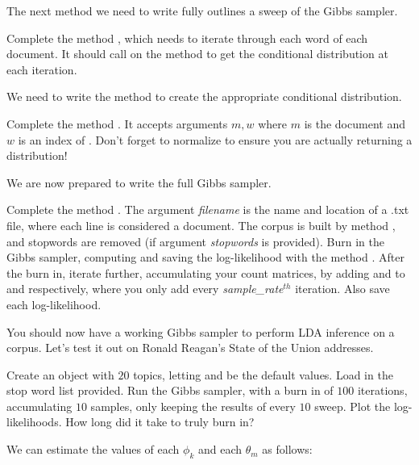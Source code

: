 The next method we need to write fully outlines a sweep of the Gibbs sampler.

\begin{problem}
Complete the method , which needs to iterate through each word of each document. It should call on the method  to get the conditional distribution at each iteration.
\end{problem}

We need to write the method to create the appropriate conditional distribution.

\begin{problem}
Complete the method . It accepts arguments $m,w$ where $m$ is the document and $w$ is an index of . Don't forget to normalize to ensure you are actually returning a distribution!
\end{problem}

We are now prepared to write the full Gibbs sampler.

\begin{problem}
Complete the method . The argument \emph{filename} is the name and location of a .txt file, where each line is considered a document. The corpus is built by method , and stopwords are removed (if argument \emph{stopwords} is provided). Burn in the Gibbs sampler, computing and saving the log-likelihood with the method . After the burn in, iterate further, accumulating your count matrices, by adding  and  to  and  respectively, where you only add every \emph{sample\_rate}$^{th}$ iteration. Also save each log-likelihood.
\end{problem}

You should now have a working Gibbs sampler to perform LDA inference on a corpus. Let's test it out on Ronald Reagan's State of the Union addresses.

\begin{problem}
Create an  object with $20$ topics, letting  and  be the default values. Load in the stop word list provided. Run the Gibbs sampler, with a burn in of $100$ iterations, accumulating $10$ samples, only keeping the results of every $10$ sweep. Plot the log-likelihoods. How long did it take to truly burn in?
\end{problem}

We can estimate the values of each $\phi_{k}$ and each $\theta_{m}$ as follows:


